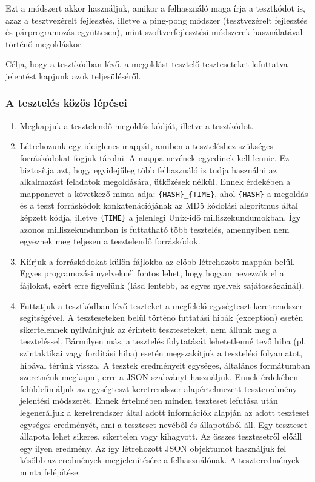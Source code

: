 \documentclass{elteikthesis}
\begin{document}
				Ezt a módszert akkor használjuk, amikor a felhasználó maga írja a tesztkódot is, azaz a tesztvezérelt fejlesztés, illetve a ping-pong módszer (tesztvezérelt fejlesztés és párprogramozás együttesen), mint szoftverfejlesztési módszerek használatával történő megoldáskor.
				
				Célja, hogy a tesztkódban lévő, a megoldást tesztelő teszteseteket lefuttatva jelentést kapjunk azok teljesüléséről.

				\subsubsection{A tesztelés közös lépései}
					\begin{enumerate}
						\item Megkapjuk a tesztelendő megoldás kódját, illetve a tesztkódot.
						\item Létrehozunk egy ideiglenes mappát, amiben a teszteléshez szükséges forráskódokat fogjuk tárolni. A mappa nevének egyedinek kell lennie. Ez biztosítja azt, hogy egyidejűleg több felhasználó is tudja használni az alkalmazást feladatok megoldására, ütközések nélkül. Ennek érdekében a mappanevet a következő minta adja: \texttt{\{HASH\}\_\{TIME\}}, ahol \texttt{\{HASH\}} a megoldás és a teszt forráskódok konkatenációjának az MD5 kódolási algoritmus által képzett kódja, illetve \texttt{\{TIME\}} a jelenlegi Unix-idő milliszekundumokban. Így azonos milliszekundumban is futtatható több tesztelés, amennyiben nem egyeznek meg teljesen a tesztelendő forráskódok.
						\item Kiírjuk a forráskódokat külön fájlokba az előbb létrehozott mappán belül. Egyes programozási nyelveknél fontos lehet, hogy hogyan nevezzük el a fájlokat, ezért erre figyelünk (lásd lentebb, az egyes nyelvek sajátosságainál).
						\item Futtatjuk a tesztkódban lévő teszteket a megfelelő egységteszt keretrendszer segítségével. A teszteseteken belül történő futtatási hibák (exception) esetén sikertelennek nyilvánítjuk az érintett teszteseteket, nem állunk meg a teszteléssel. Bármilyen más, a tesztelés folytatását lehetetlenné tevő hiba (pl. szintaktikai vagy fordítási hiba) esetén megszakítjuk a tesztelési folyamatot, hibával térünk vissza. A tesztek eredményeit egységes, általános formátumban szeretnénk megkapni, erre a JSON szabványt használjuk. Ennek érdekében felüldefiniáljuk az egységteszt keretrendszer alapértelmezett teszteredmény-jelentési módszerét. Ennek értelmében minden teszteset lefutása után legeneráljuk a keretrendszer által adott információk alapján az adott teszteset egységes eredményét, ami a teszteset nevéből és állapotából áll. Egy teszteset állapota lehet sikeres, sikertelen vagy kihagyott. Az összes tesztesetről előáll egy ilyen eredmény. Az így létrehozott JSON objektumot használjuk fel később az eredmények megjelenítésére a felhasználónak. A teszteredmények minta felépítése:

\end{enumerate}
\end{document}

